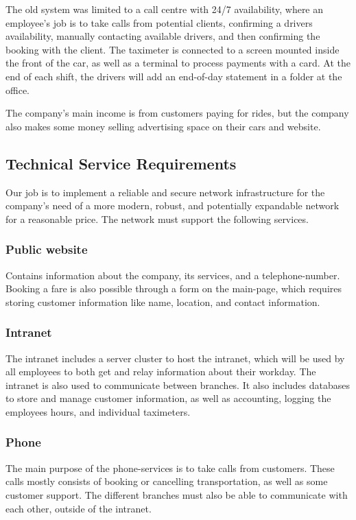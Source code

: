 The old system was limited to a call centre with 24/7 availability, where an employee's job is to take calls from potential clients, confirming a drivers availability, manually contacting available drivers, and then confirming the booking with the client. The taximeter is connected to a screen mounted inside the front of the car, as well as a terminal to process payments with a card. At the end of each shift, the drivers will add an end-of-day statement in a folder at the office. %

The company's main income is from customers paying for rides, but the company also makes some money selling advertising space on their cars and website.

\subsection{Technical Service Requirements}
Our job is to implement a reliable and secure network infrastructure for the company's need of a more modern, robust, and potentially expandable network for a reasonable price. 
The network must support the following services.

\subsubsection{Public website}
Contains information about the company, its services, and a telephone-number. 
Booking a fare is also possible through a form on the main-page, which requires storing customer information like name, location, and contact information.

\subsubsection{Intranet}
The intranet includes a server cluster to host the intranet, which will be used by all employees to both get and relay information about their workday. %
The intranet is also used to communicate between branches.
It also includes databases to store and manage customer information, as well as accounting, logging the employees hours, and individual taximeters.

\subsubsection{Phone}
The main purpose of the phone-services is to take calls from customers.
These calls mostly consists of booking or cancelling transportation, as well as some customer support. 
The different branches must also be able to communicate with each other, outside of the intranet.

